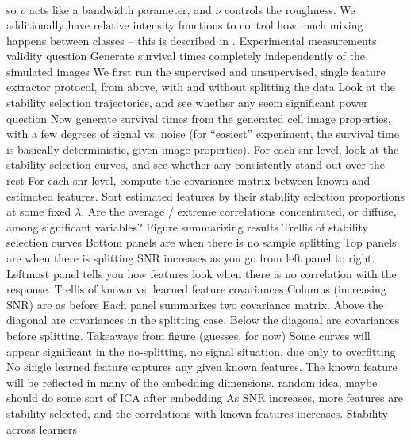 \documentclass[11pt]{article}
\begin{document}
\begin{outline}
\begin{align}
        \end{align}
        so $\rho$ acts like a bandwidth parameter, and $\nu$ controls the
        roughness. We additionally have relative intensity functions to control
        how much mixing happens between classes -- this is described in
        \citep{diggle2013spatial}.
    \2 Experimental measurements
      \3 validity question
        \4 Generate survival times completely independently of the simulated
        images
        \4 We first run the supervised and unsupervised, single feature extractor
        protocol, from above, with and without splitting the data
        \4 Look at the stability selection trajectories, and see whether any
        seem significant
      \3 power question
        \4 Now generate survival times from the generated cell image properties,
        with a few degrees of signal vs. noise (for ``easiest'' experiment, the
        survival time is basically deterministic, given image properties).
        \4 For each snr level, look at the stability selection curves, and see
        whether any consistently stand out over the rest
        \4 For each snr level, compute the covariance matrix between known and
        estimated features. Sort estimated features by their stability selection
        proportions at some fixed $\lambda$. Are the average / extreme
        correlations concentrated, or diffuse, among significant variables?
    \2 Figure summarizing results
      \3 Trellis of stability selection curves
        \4 Bottom panels are when there is no sample splitting
        \4 Top panels are when there is splitting
        \4 SNR increases as you go from left panel to right. Leftmost panel
        tells you how features look when there is no correlation with the
        response.
      \3 Trellis of known vs. learned feature covariances
        \4 Columns (increasing SNR) are as before
        \4 Each panel summarizes two covariance matrix. Above the diagonal are
        covariances in the splitting case. Below the diagonal are covariances
        before splitting.
    \2 Takeaways from figure (guesses, for now)
      \3 Some curves will appear significant in the no-splitting, no signal
      situation, due only to overfitting
      \3 No single learned feature captures any given known features. The known
      feature will be reflected in many of the embedding dimensions.
        \4 random idea, maybe should do some sort of ICA after embedding
      \3 As SNR increases, more features are stability-selected, and the
      correlations with known features increases.
  \1 Stability across learners

\end{outline}
\end{document}
